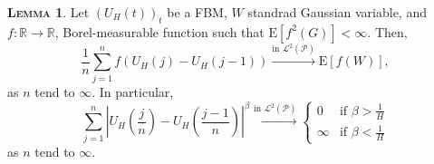 \documentclass[a4paper, twoside, 11pt]{article}
\theoremstyle{definition}
\newtheorem{lemma}[definition]{\scshape Lemma}
\begin{document}
\begin{lemma}
  Let $(U_H(t))_{t}$ be a FBM, $W$ standrad Gaussian variable, and $f: \mathbb{R}\rightarrow \mathbb{R}$, Borel-measurable function such that $\mathrm{E}[f^2(G)] < \infty$. Then, 
  \begin{equation*}
	\frac{1}{n}\sum\limits_{j=1}^n f(U_H(j)-U_H(j-1)) \overset{\text{in }\mathcal{L}^2(\mathcal{P})}{\rightarrow} \mathrm{E}[f(W)],
  \end{equation*}
  as $n$ tend to $\infty$. In particular,
  \begin{equation}
	\sum_{j=1}^n |U_H(\frac{j}{n}) - U_H(\frac{j-1}{n})|^\beta \overset{\text{in }\mathcal{L}^2(\mathcal{P})}{\rightarrow} \begin{cases}
	  0 &\mbox{if } \beta > \frac{1}{H}\\
	  \infty &\mbox{if } \beta < \frac{1}{H}
	\end{cases}
	\label{sec:semilemma}
  \end{equation}
  as $n$ tend to $\infty$.
\end{lemma}
\end{document}

